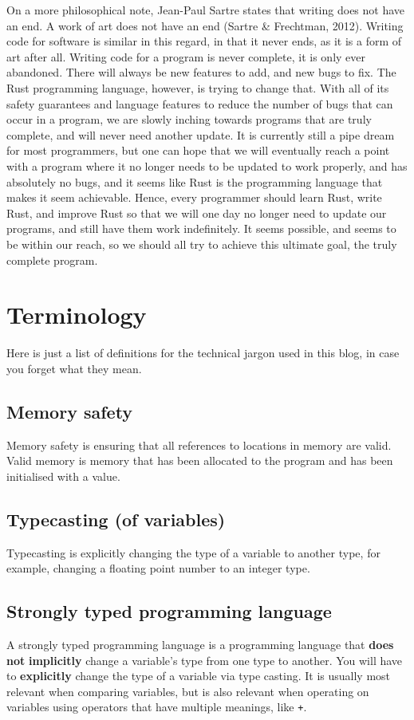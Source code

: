 \documentclass[11pt]{article}
\makeatletter
\newcommand{\citeprocitem}[2]{\hyper@linkstart{cite}{citeproc_bib_item_#1}#2\hyper@linkend}
\makeatother
\begin{document}
On a more philosophical note,
Jean-Paul Sartre states that writing does not
have an end. A work of art does not have an end
(\citeprocitem{32}{Sartre \& Frechtman, 2012}).
Writing code for software is similar in this regard,
in that it never ends, as it is a form of art after all.
Writing code for a program is never complete,
it is only ever abandoned.
There will always be new features to add,
and new bugs to fix. The Rust programming
language, however, is trying to change that.
With all of its safety guarantees and
language features to reduce the number of
bugs that can occur in a program, we are
slowly inching towards programs that are
truly complete, and will never need another update.
It is currently still a pipe dream for most programmers,
but one can hope that we will eventually
reach a point with a program where it no longer
needs to be updated to work properly,
and has absolutely no bugs, and it seems like
Rust is the programming language that makes it
seem achievable. Hence, every programmer should
learn Rust, write Rust, and improve Rust so that
we will one day no longer need to update our
programs, and still have them work indefinitely.
It seems possible, and seems to be within our reach,
so we should all try to achieve this ultimate goal,
the truly complete program.

 \newpage

\section{Terminology}
\label{sec:orgca2adf1}
Here is just a list of definitions for the
technical jargon used in this blog, in case
you forget what they mean.

\subsection{Memory safety}
\label{sec:org1333ca7}
Memory safety is ensuring that all references
to locations in memory are valid. Valid memory
is memory that has been allocated to the program
and has been initialised with a value.

\subsection{Typecasting (of variables)}
\label{sec:orgb6baa6a}
Typecasting is explicitly changing
the type of a variable to another type,
for example, changing a floating point
number to an integer type.

\subsection{Strongly typed programming language}
\label{sec:org047519e}
A strongly typed programming language
is a programming language that \textbf{does not}
\textbf{implicitly} change a variable's type
from one type to another. You will
have to \textbf{explicitly} change the type
of a variable via type casting. It is usually
most relevant when comparing variables,
but is also relevant when operating on
variables using operators that have
multiple meanings, like \texttt{+}.
\end{document}
